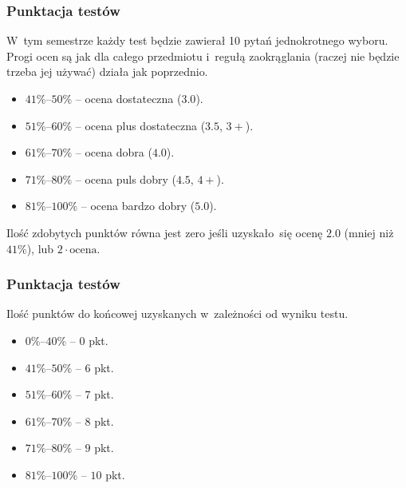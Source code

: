 \documentclass[10pt,t]{beamer}
\begin{document}
\begin{frame}
  \frametitle{Punktacja testów}


  W~tym semestrze każdy test będzie zawierał 10 pytań jednokrotnego wyboru.
  Progi ocen są jak dla całego przedmiotu i~regułą zaokrąglania (raczej nie
  będzie trzeba jej używać) działa jak poprzednio.

  \begin{itemize}

  \item $41\%\text{--}50\%$ -- ocena dostateczna ($3.0$).

  \item $51\%\text{--}60\%$ -- ocena plus dostateczna ($3.5$, $3+$).

  \item $61\%\text{--}70\%$ -- ocena dobra ($4.0$).

  \item $71\%\text{--}80\%$ -- ocena puls dobry ($4.5$, $4+$).

  \item $81\%\text{--}100\%$ -- ocena bardzo dobry ($5.0$).

  \end{itemize}

  Ilość zdobytych punktów równa jest zero jeśli uzyskało~się ocenę $2.0$
  (mniej niż $41\%$), lub $2 \cdot \text{ocena}$.

\end{frame}




\begin{frame}
  \frametitle{Punktacja testów}


  Ilość punktów do końcowej uzyskanych w~zależności od wyniku testu.

  \begin{itemize}

  \item $0\%\text{--}40\%$ -- $0$ pkt.

  \item $41\%\text{--}50\%$ -- $6$ pkt.

  \item $51\%\text{--}60\%$ -- $7$ pkt.

  \item $61\%\text{--}70\%$ -- $8$ pkt.

  \item $71\%\text{--}80\%$ -- $9$ pkt.

  \item $81\%\text{--}100\%$ -- $10$ pkt.

  \end{itemize}

\end{frame}
\end{document}
